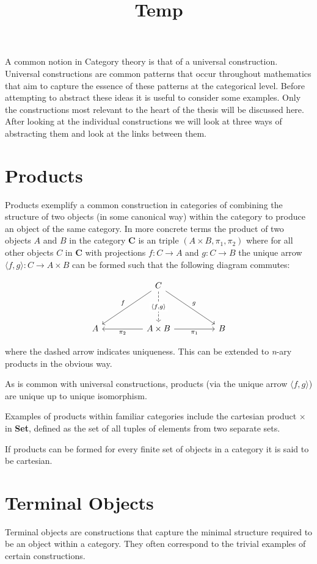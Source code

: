 \documentclass[a4paper,12pt]{article}
\date{}
\title{Temp\vspace{-3.5em}}
\begin{document}
\maketitle
A common notion in Category theory is that of a universal construction.
Universal constructions are common patterns that occur throughout mathematics
that aim to capture the essence of these patterns at the categorical level.
Before attempting to abstract these ideas it is useful to consider some
examples. Only the constructions most relevant to the heart of the thesis will
be discussed here.  After looking at the individual constructions we will look
at three ways of abstracting them and look at the links between them.

\section{Products}
Products exemplify a common construction in categories of combining the
structure of two objects (in some canonical way) within the category to produce
an object of the same category. In more concrete terms the product of two
objects $A$ and $B$ in the category $\textbf{C}$ is an triple $(A \times B,
\pi_{1}, \pi_{2})$ where for all other objects $C$ in $\textbf{C}$ with
projections $f: C \rightarrow A$ and $g: C \rightarrow B$ the unique arrow
$\langle f, g\rangle : C \rightarrow A \times B$ can be formed such that the
following diagram commutes:

\[\begin{tikzcd}[sep=huge]
 & C \arrow[ld, "f"'] \arrow[rd, "g"] \arrow[d, "{\langle f, g\rangle}" description, dashed] &  \\
A & A \times B \arrow[l, "\pi_2"] \arrow[r, "\pi_1"'] & B
\end{tikzcd}\]

where the dashed arrow indicates uniqueness. This can be extended to
\textit{n}-ary products in the obvious way.

As is common with universal constructions, products (via the unique arrow
$\langle f, g \rangle$) are unique up to unique isomorphism.

Examples of products within familiar categories include the cartesian product
$\times$ in \textbf{Set}, defined as the set of all tuples of elements from two
separate sets.

If products can be formed for every finite set of objects in a category it is
said to be cartesian.

\section{Terminal Objects}
Terminal objects are constructions that capture the
minimal structure required to be an object within a category. They often
correspond to the trivial examples of certain constructions.
\end{document}
